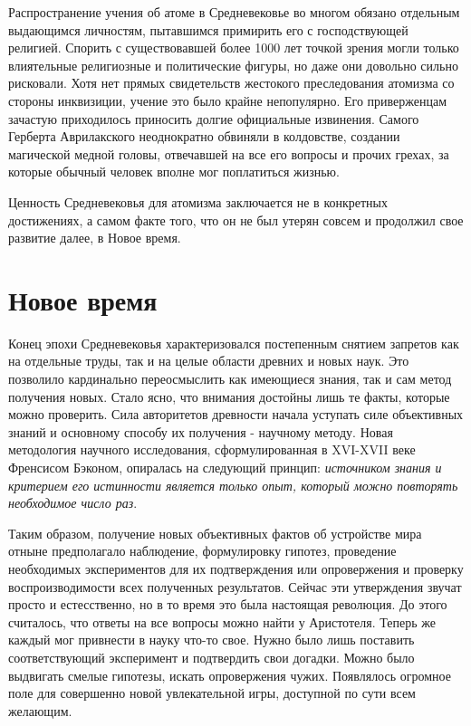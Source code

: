 Распространение учения об атоме в Средневековье во многом обязано отдельным выдающимся личностям, пытавшимся примирить его с господствующей религией.
Спорить с существовавшей более 1000 лет точкой зрения могли только влиятельные религиозные и политические фигуры, но даже они довольно сильно рисковали.
Хотя нет прямых свидетельств жестокого преследования атомизма со стороны инквизиции, учение это было крайне непопулярно.
Его приверженцам зачастую приходилось приносить долгие официальные извинения.
Самого Герберта Аврилакского неоднократно обвиняли в колдовстве, создании магической медной головы, отвечавшей на все его вопросы и прочих грехах, за которые обычный человек вполне мог поплатиться жизнью.

Ценность Средневековья для атомизма заключается не в конкретных достижениях, а самом факте того, что он не был утерян совсем и продолжил свое развитие далее, в Новое время.


\section*{Новое время}

Конец эпохи Средневековья характеризовался постепенным снятием запретов как на отдельные труды, так и на целые области древних и новых наук. 
Это позволило кардинально переосмыслить как имеющиеся знания, так и сам метод получения новых.
Стало ясно, что внимания достойны лишь те факты, которые можно проверить.
Сила авторитетов древности начала уступать силе объективных знаний и основному способу их получения - научному методу.
Новая методология научного исследования, сформулированная в XVI-XVII веке Френсисом Бэконом, опиралась на следующий принцип: \textit{источником знания и критерием его истинности является только опыт, который можно повторять необходимое число раз}.

Таким образом, получение новых объективных фактов об устройстве мира отныне предполагало наблюдение, формулировку гипотез, проведение необходимых экспериментов для их подтверждения или опровержения и проверку воспроизводимости всех полученных результатов.
Сейчас эти утверждения звучат просто и естесственно, но в то время это была настоящая революция.
До этого считалось, что ответы на все вопросы можно найти у Аристотеля.
Теперь же каждый мог привнести в науку что-то свое.
Нужно было лишь поставить соответствующий эксперимент и подтвердить свои догадки.
Можно было выдвигать смелые гипотезы, искать опровержения чужих.
Появлялось огромное поле для совершенно новой увлекательной игры, доступной по сути всем желающим.


